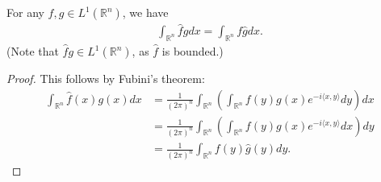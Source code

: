 \begin{lemma}
    For any \(f,g\in L^1(\mathbb{R}^n)\), we have 
    \begin{align*}
        \int_{\mathbb{R}^n} \hat{f}gdx = \int_{\mathbb{R}^n}f\hat{g}dx. 
    \end{align*}
    (Note that \(\hat{f}g\in L^1(\mathbb{R}^n)\), as \(\hat{f}\) is bounded.)
\end{lemma}
\ifdetailed 
\begin{proof}
    This follows by Fubini's theorem:
    \begin{align*}
        \int_{\mathbb{R}^n} \hat{f}(x)g(x) dx &= \frac{1}{(2\pi)^n}\int_{\mathbb{R}^n}\left(\int_{\mathbb{R}^n}f(y)g(x)e^{-i\langle x,y\rangle}dy\right) dx \\
        &=\frac{1}{(2\pi)^n}\int_{\mathbb{R}^n}\left(\int_{\mathbb{R}^n}f(y)g(x)e^{-i\langle x,y\rangle}dx\right) dy \\
        &= \frac{1}{(2\pi)^n}\int_{\mathbb{R}^n}f(y)\hat{g}(y)dy.
    \end{align*}
\end{proof}
